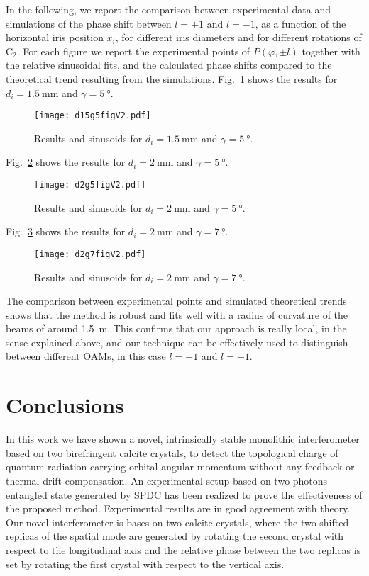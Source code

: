 \documentclass[
reprint,
amsmath,amssymb,
aps,
showkeys
]{revtex4-2}
\begin{document}
In the following, we report the comparison between experimental data and simulations of the phase shift between $l=+1$ and $l=-1$, as a function of the horizontal iris position $x_i$, for different iris diameters and for different rotations of $\mathrm{C}_2$.
For each figure we report the experimental points of $P\left(\varphi,\pm l\right)$ together with the relative sinusoidal fits, and the calculated phase shifts compared to the theoretical trend resulting from the simulations.
Fig.~\ref{fig:resume1} shows the results for $d_i=\SI{1.5}{\milli\meter}$ and $\gamma=\SI{5}{\degree}$.
%
\begin{figure}
\texttt{[image: d15g5figV2.pdf]}
\caption{Results and sinusoids for $d_i = \SI{1.5}{\milli\meter}$ and $\gamma = \SI{5}{\degree}$.}
\label{fig:resume1}
\end{figure}
%
Fig.~\ref{fig:resume3} shows the results for $d_i=\SI{2}{\milli\meter}$ and $\gamma=\SI{5}{\degree}$.
%
\begin{figure}
\texttt{[image: d2g5figV2.pdf]}
\caption{Results and sinusoids for $d_i = \SI{2}{\milli\meter}$ and $\gamma = \SI{5}{\degree}$.}
\label{fig:resume3}
\end{figure}
%
Fig.~\ref{fig:resume4} shows the results for $d_i=\SI{2}{\milli\meter}$ and $\gamma=\SI{7}{\degree}$.
%
\begin{figure}\vspace{0.5cm}
\texttt{[image: d2g7figV2.pdf]}
\caption{Results and sinusoids for $d_i = \SI{2}{\milli\meter}$ and $\gamma = \SI{7}{\degree}$.}
\label{fig:resume4}
\end{figure}
%
The comparison between experimental points and simulated theoretical trends shows that the method is robust and fits well with a radius of curvature of the beams of around \SI{1.5}{\meter}.
This confirms that our approach is really local, in the sense explained above, and our technique can be effectively used to distinguish between different OAMs, in this case $l=+1$ and $l=-1$.


\section{Conclusions}\label{sec:conclusion}
In this work we have shown a novel, intrinsically stable monolithic interferometer based on two birefringent calcite crystals, to detect the topological charge of quantum radiation carrying orbital angular momentum without any feedback or thermal drift compensation. 
An experimental setup based on two photons entangled state generated by SPDC has been realized to prove the effectiveness of the proposed method.
Experimental results are in good agreement with theory.
Our novel interferometer is bases on two calcite crystals, where the two shifted replicas of the spatial mode are generated by rotating the second crystal with respect to the longitudinal axis and the relative phase between the two replicas is set by rotating the first crystal with respect to the vertical axis.
\end{document}
